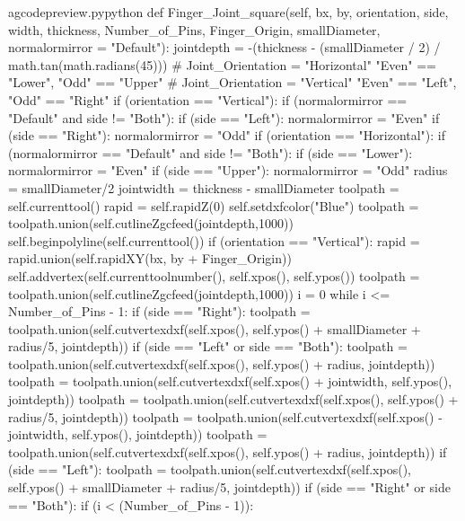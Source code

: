 \documentclass{ltxdoc}
\begin{document}
\begin{writecode}{a}{gcodepreview.py}{python}
    def Finger_Joint_square(self, bx, by, orientation, side, width, thickness, Number_of_Pins, Finger_Origin, smallDiameter, normalormirror = "Default"):
        jointdepth = -(thickness - (smallDiameter / 2) / math.tan(math.radians(45)))
    # Joint_Orientation = "Horizontal" "Even" == "Lower", "Odd" == "Upper"
    # Joint_Orientation = "Vertical" "Even" == "Left", "Odd" == "Right"
        if (orientation == "Vertical"):
            if (normalormirror == "Default" and side != "Both"):
                if (side == "Left"):
                     normalormirror = "Even"
                if (side == "Right"):
                     normalormirror = "Odd"
        if (orientation == "Horizontal"):
            if (normalormirror == "Default" and side != "Both"):
                if (side == "Lower"):
                     normalormirror = "Even"
                if (side == "Upper"):
                     normalormirror = "Odd"
        radius = smallDiameter/2
        jointwidth = thickness - smallDiameter
        toolpath = self.currenttool()
        rapid = self.rapidZ(0)
        self.setdxfcolor("Blue")
        toolpath = toolpath.union(self.cutlineZgcfeed(jointdepth,1000))
        self.beginpolyline(self.currenttool())
        if (orientation == "Vertical"):
            rapid = rapid.union(self.rapidXY(bx, by + Finger_Origin))
            self.addvertex(self.currenttoolnumber(), self.xpos(), self.ypos())
            toolpath = toolpath.union(self.cutlineZgcfeed(jointdepth,1000))
            i = 0
            while i <= Number_of_Pins - 1:
                if (side == "Right"):
                    toolpath = toolpath.union(self.cutvertexdxf(self.xpos(), self.ypos() + smallDiameter + radius/5, jointdepth))
                if (side == "Left" or side == "Both"):
                    toolpath = toolpath.union(self.cutvertexdxf(self.xpos(), self.ypos() + radius, jointdepth))
                    toolpath = toolpath.union(self.cutvertexdxf(self.xpos() + jointwidth, self.ypos(), jointdepth))
                    toolpath = toolpath.union(self.cutvertexdxf(self.xpos(), self.ypos() + radius/5, jointdepth))
                    toolpath = toolpath.union(self.cutvertexdxf(self.xpos() - jointwidth, self.ypos(), jointdepth))
                    toolpath = toolpath.union(self.cutvertexdxf(self.xpos(), self.ypos() + radius, jointdepth))
                if (side == "Left"):
                    toolpath = toolpath.union(self.cutvertexdxf(self.xpos(), self.ypos() + smallDiameter + radius/5, jointdepth))
                if (side == "Right" or side == "Both"):
                    if (i < (Number_of_Pins - 1)):

\end{writecode}
\end{document}
